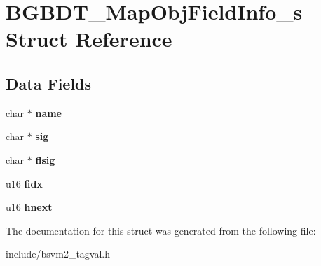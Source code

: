 \hypertarget{structBGBDT__MapObjFieldInfo__s}{\section{B\-G\-B\-D\-T\-\_\-\-Map\-Obj\-Field\-Info\-\_\-s Struct Reference}
\label{structBGBDT__MapObjFieldInfo__s}
}
\subsection*{Data Fields}
\begin{DoxyCompactItemize}
\item 
\hypertarget{structBGBDT__MapObjFieldInfo__s_ae30d2e76bbc5d5271c2b0fd2a61d209a}{char $\ast$ {\bfseries name}}\label{structBGBDT__MapObjFieldInfo__s_ae30d2e76bbc5d5271c2b0fd2a61d209a}

\item 
\hypertarget{structBGBDT__MapObjFieldInfo__s_a4a03bc43cc9ace12837ae517e3e20497}{char $\ast$ {\bfseries sig}}\label{structBGBDT__MapObjFieldInfo__s_a4a03bc43cc9ace12837ae517e3e20497}

\item 
\hypertarget{structBGBDT__MapObjFieldInfo__s_acd0273f896f976cb90f6b99832a20562}{char $\ast$ {\bfseries flsig}}\label{structBGBDT__MapObjFieldInfo__s_acd0273f896f976cb90f6b99832a20562}

\item 
\hypertarget{structBGBDT__MapObjFieldInfo__s_a7ed5b6d50c2e21712e1698cbca4f54e7}{u16 {\bfseries fidx}}\label{structBGBDT__MapObjFieldInfo__s_a7ed5b6d50c2e21712e1698cbca4f54e7}

\item 
\hypertarget{structBGBDT__MapObjFieldInfo__s_a01a5b13a1f063a7db1e9a5ab2898323e}{u16 {\bfseries hnext}}\label{structBGBDT__MapObjFieldInfo__s_a01a5b13a1f063a7db1e9a5ab2898323e}

\end{DoxyCompactItemize}


The documentation for this struct was generated from the following file\-:\begin{DoxyCompactItemize}
\item 
include/bsvm2\-\_\-tagval.\-h\end{DoxyCompactItemize}
